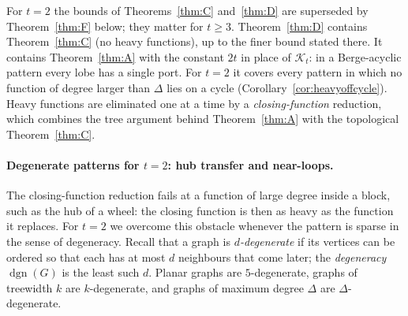 \documentclass[11pt,letterpaper]{article}
\theoremstyle{definition}
\begin{document}
For $t=2$ the bounds of Theorems~\ref{thm:C} and~\ref{thm:D} are superseded by Theorem~\ref{thm:F} below;
they matter for $t\ge3$. Theorem~\ref{thm:D} contains Theorem~\ref{thm:C} (no heavy functions), up to the finer bound
stated there. It contains Theorem~\ref{thm:A} with the constant $2t$ in place of $\mathcal{K}_t$: in a
Berge-acyclic pattern every lobe has a single port. For $t=2$ it covers every pattern in which no
function of degree larger than $\Delta$ lies on a cycle (Corollary~\ref{cor:heavyoffcycle}). Heavy
functions are eliminated one at a time by a \emph{closing-function} reduction, which combines the
tree argument behind Theorem~\ref{thm:A} with the topological Theorem~\ref{thm:C}.

\paragraph{Degenerate patterns for $t=2$: hub transfer and near-loops.}
The closing-function reduction fails at a function of large degree inside a block, such as the
hub of a wheel: the closing function is then as heavy as the function it replaces. For $t=2$ we
overcome this obstacle whenever the pattern is sparse in the sense of degeneracy. Recall that a
graph is \emph{$d$-degenerate} if its vertices can be ordered so that each has at most $d$
neighbours that come later; the \emph{degeneracy} $\operatorname{dgn}(G)$ is the least such $d$.
Planar graphs are $5$-degenerate, graphs of treewidth $k$ are $k$-degenerate, and graphs of
maximum degree $\Delta$ are $\Delta$-degenerate.
\end{document}
